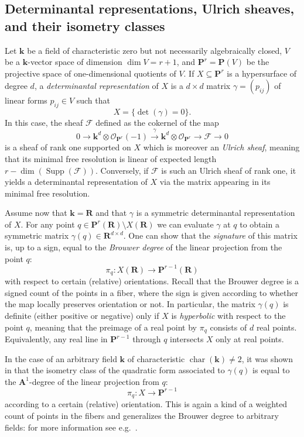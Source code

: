 \documentclass[12pt]{amsart}
\numberwithin{equation}{section}
\numberwithin{thmcounter}{section}
\theoremstyle{definition}
\theoremstyle{claim}
\newcommand{\nR}{\mathbf{R}}
\newcommand{\kk}{\mathbf{k}}
\newcommand{\nP}{\mathbf{P}}
\newcommand{\nA}{\mathbf{A}}
\newcommand{\sF}{\mathscr{F}}
\newcommand{\sO}{\mathscr{O}}
\DeclareMathOperator{\Supp}{Supp}
\begin{document}
\subsection{Determinantal representations, Ulrich sheaves, and their isometry classes}
Let $\kk$ be a field of characteristic zero but not necessarily algebraically closed, $V$ be a $\kk$-vector space of dimension $\dim V=r+1$, and $\nP^r=\nP(V)$ be the projective space of one-dimensional quotients of $V$.
 If $X \subseteq \nP^r$ is a hypersurface of degree $d$, a \emph{determinantal representation} of $X$ is a $d\times d$ matrix $\gamma=(p_{ij})$ of linear forms $p_{ij}\in V$ such that
\begin{equation}\label{eq:det_rep_usual}
X = \{ \det(\gamma) = 0 \}. 
\end{equation}
In this case, the sheaf $\sF$ defined as the cokernel of the map
\[ 0 \longrightarrow \kk^d\otimes \sO_{\nP^r}(-1)\overset{\gamma}{\longrightarrow} \kk^d\otimes \sO_{\nP^r} \longrightarrow \sF \longrightarrow 0 \]
is a sheaf of rank one supported on $X$ which is moreover an \emph{Ulrich sheaf}, meaning that its minimal free resolution is linear of expected length $r-\dim(\Supp(\sF))$. Conversely, if $\sF$ is such an Ulrich sheaf of rank one, it yields a determinantal representation of $X$ via the matrix appearing in its minimal free resolution.
\medskip

Assume now that $\kk=\nR$ and that $\gamma$ is a symmetric determinantal representation of $X$. For any point $q\in \nP^r(\nR)\setminus X(\nR)$ we can evaluate $\gamma$ at $q$ to obtain a symmetric matrix
 $\gamma(q) \in \nR^{d\times d}$. One can show that the \emph{signature} of this matrix is, up to a sign, equal to the \emph{Brouwer degree} of the linear projection from the point $q$:
\[ \pi_q \colon X(\nR) \longrightarrow \nP^{r-1}(\nR) \]
 with respect to certain (relative) orientations. Recall that the Brouwer degree is a signed count of the points in a fiber, where the sign is given according to whether the map locally preserves orientation or not. In particular, the matrix $\gamma(q)$ is definite (either positive or negative) only if $X$ is \emph{hyperbolic} with respect to the point $q$, meaning that the preimage of a real point by $\pi_q$ consists of $d$ real points. Equivalently, any real line in $\nP^{r-1}$ through $q$ intersects $X$ only at real points.
  \medskip 
 


 In the case of an arbitrary field $\kk$ of characteristic $\operatorname{char}(\kk)\ne 2$, it was shown in \cite{agostinikummer} that the {isometry class} of the quadratic form associated to $\gamma(q)$ is equal
 to the $\nA^1$-degree of the linear projection from $q$:
 \[ \pi_q \colon X \longrightarrow \nP^{r-1} \]
according to a certain (relative) orientation. This is again a kind of a weighted count of points in the fibers and generalizes the Brouwer degree to arbitrary fields: for more information see e.g.~\cite{kw19,Lev20,pauliwickelgren}.
\medskip
\end{document}
